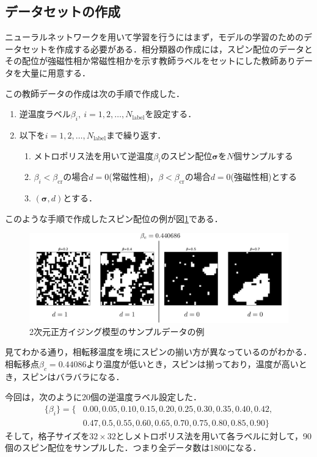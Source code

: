 \documentclass[a4paper,11pt]{jsreport}
\begin{document}
\subsection{データセットの作成}
ニューラルネットワークを用いて学習を行うにはまず，モデルの学習のためのデータセットを作成する必要がある．相分類器の作成には，スピン配位のデータとその配位が強磁性相か常磁性相かを示す教師ラベルをセットにした教師ありデータを大量に用意する．\par
この教師データの作成は次の手順で作成した．
\begin{enumerate}
  \item 逆温度ラベル$\beta_i, \ i=1,2,\dots,N_{\text{label}}$を設定する．
  \item 以下を$i=1,2,\dots,N_{\text{label}}$まで繰り返す．
  \begin{enumerate}
    \item メトロポリス法を用いて逆温度$\beta_i$のスピン配位$\bm{\sigma}$を$N$個サンプルする
    \item $\beta_i<\beta_{\text{cr}}$の場合$d=0$(常磁性相)，$\beta<\beta_{\text{cr}}$の場合$d=0$(強磁性相)とする
    \item $(\bm{\sigma},d)$とする．
  \end{enumerate}
\end{enumerate}
このような手順で作成したスピン配位の例が図\ref{相の分類器データセット}である．
\begin{figure}[H]
   \begin{center}
       \includegraphics[width=\linewidth]{image/配位ラベルと相転移ラベル.png}
       \caption{2次元正方イジング模型のサンプルデータの例}
       \label{相の分類器データセット}
   \end{center}
\end{figure}
見てわかる通り，相転移温度を境にスピンの揃い方が異なっているのがわかる．相転移点$\beta_c = 0.44086$より温度が低いとき，スピンは揃っており，温度が高いとき，スピンはバラバラになる．\par
今回は，次のように20個の逆温度ラベル設定した．
\begin{align*}
  \{\beta_i\} 
  = \{ &0.00,0.05,0.10,0.15,0.20,0.25,0.30,0.35,0.40,0.42,\\
  &0.47,0.5,0.55,0.60,0.65,0.70,0.75,0.80,0.85,0.90 \}
\end{align*}
そして，格子サイズを$32 \times 32$としメトロポリス法を用いて各ラベルに対して，90個のスピン配位をサンプルした．つまり全データ数は1800になる．\par
\end{document}
